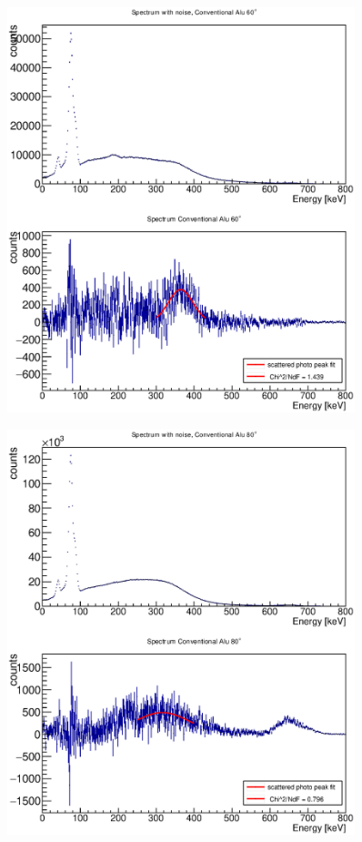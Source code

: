 \documentclass{article}
\begin{document}
\begin{figure}[H]
    \centering
    \includegraphics[width=0.9\textwidth]{Graphen/compton_spektren/60Alu.eps}
    \caption{}
\end{figure}
\begin{figure}[H]
    \centering
    \includegraphics[width=0.9\textwidth]{Graphen/compton_spektren/80Alu.eps}
    \caption{}
    \label{80_alu}
\end{figure}
\end{document}
